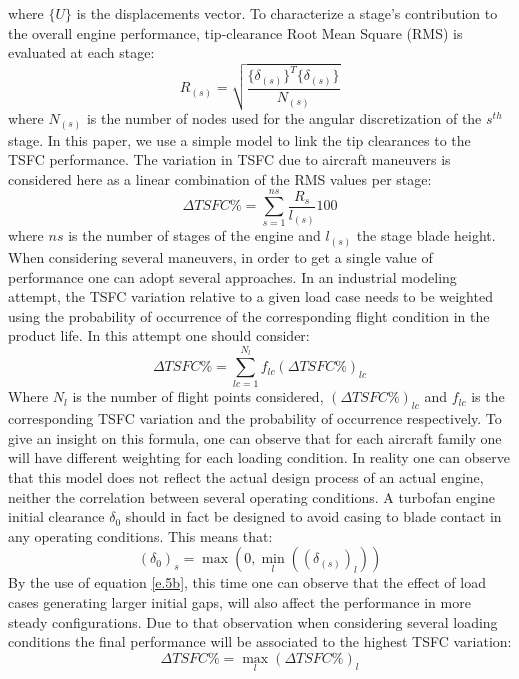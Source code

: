 where $\lbrace U \rbrace$ is the displacements vector.
To characterize a stage's contribution to the overall engine performance, tip-clearance Root Mean Square (RMS) is evaluated at each stage:
\begin{equation}
\label{e.4}
R_{(s)} =\sqrt{\frac{\lbrace\delta_{(s)}\rbrace^T\lbrace\delta_{(s)}\rbrace}{N_{(s)}}}
\end{equation}
where $N_{(s)}$ is the number of nodes used for the angular discretization of the $s^{th}$ stage. 
In this paper, we use a simple model to link the tip clearances to the TSFC performance. The variation in TSFC due to aircraft maneuvers is considered here as a linear combination of the RMS values per stage:
\begin{equation}
\label{e.5}
\Delta TSFC \% = \sum_{s=1}^{ns}\frac{R_{s}}{l_{(s)}}100
\end{equation}
where $ns$ is the number of stages of the engine and $l_{(s)}$ the stage blade height.
When considering several maneuvers, in order to get a single value of performance one can adopt several approaches.
In an industrial modeling attempt, the TSFC variation relative to a given load case needs to be weighted using the probability of occurrence  of the corresponding flight condition in the product life. 
In this attempt one should consider:
\begin{equation}
\label{e.5b}
\Delta TSFC \% = \sum_{lc=1}^{N_l}f_{lc}(\Delta TSFC \%)_{lc}
\end{equation}
Where $N_l$ is the number of flight points considered, $(\Delta TSFC \%)_{lc}$ and $f_{lc}$ is the corresponding TSFC variation and the probability of occurrence respectively. To give an insight on this formula, one can observe that for each aircraft family one will have different weighting for each loading condition. In reality one can observe that this model does not reflect the actual design process of an actual engine, neither the correlation between several operating conditions. A turbofan engine initial clearance $\delta_0$ should in fact be designed to avoid casing to blade contact in any operating conditions. This means that:
\begin{equation}
(\delta_0)_s=\max{\left(0, \min_{l}{\left((\delta_{(s)})_l\right)}\right)}
\end{equation}
By the use of equation \ref{e.5b}, this time one can observe that the effect of load cases generating larger initial gaps, will also affect the performance in more steady configurations. Due to that observation when considering several loading conditions the final performance will be associated to the highest TSFC variation:
 \begin{equation}
 \label{e.5c}
 \Delta TSFC \% = \max_l(\Delta TSFC \%)_l
 \end{equation}
